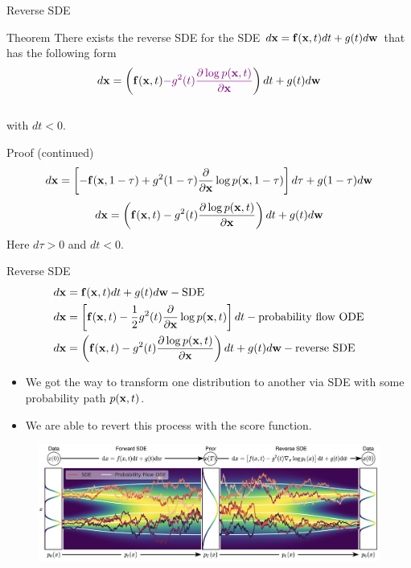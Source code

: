 \begin{frame}{Reverse SDE}
	\begin{block}{Theorem}
		There exists the reverse SDE for the SDE $d\mathbf{x} = \mathbf{f}(\mathbf{x}, t) dt + g(t) d \mathbf{w}$ that has the following form
		\vspace{-0.3cm}
		\[
			d\mathbf{x} = \left(\mathbf{f}(\mathbf{x}, t) {\color{violet}- g^2(t) \frac{\partial \log p(\mathbf{x}, t)}{\partial \mathbf{x}}}\right) dt + g(t) d \mathbf{w}
		\]
		\vspace{-0.5cm} \\
		with $dt < 0$.
	\end{block}
	\begin{block}{Proof (continued)}
		\vspace{-0.7cm}
		\[
			d\mathbf{x} = \left[- \mathbf{f}(\mathbf{x}, 1 - \tau) + g^2(1 - \tau) \frac{\partial}{\partial \mathbf{x}} \log p(\mathbf{x}, 1 - \tau) \right] d \tau + g(1 - \tau) d \mathbf{w}
		\]
		\[
			d\mathbf{x} = \left(\mathbf{f}(\mathbf{x}, t) - g^2(t) \frac{\partial \log p(\mathbf{x}, t)}{\partial \mathbf{x}}\right) dt + g(t) d \mathbf{w}
		\]
		Here $d\tau > 0$ and $dt < 0$.
	\end{block}
\end{frame}
\begin{frame}{Reverse SDE}
	\vspace{-0.5cm}
	\begin{align*}
		d\mathbf{x} &= \mathbf{f}(\mathbf{x}, t) dt + g(t) d \mathbf{w} - \text{SDE} \\
		d\mathbf{x} &= \left[\mathbf{f}(\mathbf{x}, t) -\frac{1}{2} g^2(t) \frac{\partial}{\partial \mathbf{x}} \log p(\mathbf{x}, t) \right] dt - \text{probability flow ODE} \\
		d\mathbf{x} &= \left(\mathbf{f}(\mathbf{x}, t) - g^2(t) \frac{\partial \log p(\mathbf{x}, t)}{\partial \mathbf{x}}\right) dt + g(t) d \mathbf{w} - \text{reverse SDE}
	\end{align*}
	\vspace{-0.5cm}
	\begin{itemize}
		\item We got the way to transform one distribution to another via SDE with some probability path $p(\mathbf{x}, t)$.
		\item We are able to revert this process with the score function.
	\end{itemize}
	\vspace{-0.3cm}
	\begin{figure}
		\includegraphics[width=0.9\linewidth]{figs/sde}
	\end{figure}
\end{frame}

